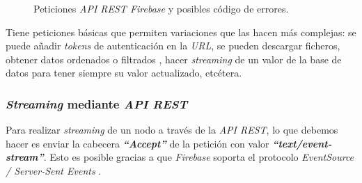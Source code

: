 \begin{figure}[tbp]
\begin{center}
\caption{Peticiones \textit{API REST Firebase} y posibles código de errores.}
\end{center}
\end{figure}

Tiene peticiones básicas que permiten variaciones que las hacen más complejas: se puede añadir \textit{tokens} de autenticación en la \textit{URL}, se pueden descargar ficheros, obtener datos ordenados \cite{firebase_firebase_2018-1} o filtrados \cite{firebase_firebase_2018-2}, hacer \textit{streaming} de un valor de la base de datos para tener siempre su valor actualizado, etcétera.

\subsubsection{\textit{Streaming} mediante \textit{API REST}}
Para realizar \textit{streaming} de un nodo a través de la \textit{API REST}, lo que debemos hacer es enviar la cabecera \textit{\textbf{``Accept''}} de la petición con valor \textit{\textbf{``text/event-stream''}}. Esto es posible gracias a que \textit{Firebase} soporta el protocolo \textit{EventSource / Server-Sent Events} \cite{noauthor_eventsource_nodate}.

